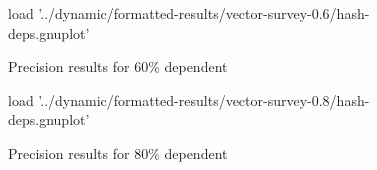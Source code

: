 \begin{figure}[H]
	\centering
	\begin{gnuplot}[terminal=pdf]
	load '../dynamic/formatted-results/vector-survey-0.6/hash-deps.gnuplot'
	\end{gnuplot}
	\caption{Precision results for 60\% dependent}
	\label{chart:precision-0.6-hash}
\end{figure}

\begin{figure}[H]
	\centering
	\begin{gnuplot}[terminal=pdf]
	load '../dynamic/formatted-results/vector-survey-0.8/hash-deps.gnuplot'
	\end{gnuplot}
	\caption{Precision results for 80\% dependent}
	\label{chart:precision-0.8-hash}
\end{figure}
